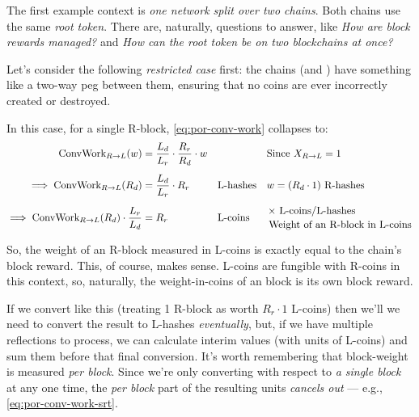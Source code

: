 The first example context is \emph{one network split over two chains}.
Both chains use the same \emph{root token}.
There are, naturally, questions to answer,
    like \emph{How are block rewards managed?}
    and \emph{How can the root token be on two blockchains at once?}

Let's consider the following \emph{restricted case} first: the chains (\cL and \cR) have something like a two-way peg between them, ensuring that no coins are ever incorrectly created or destroyed.

In this case, for a single R-block, \autoref{eq:por-conv-work} collapses to:
\begin{align}
    \text{ConvWork}_{R\rightarrow L}(w) = \; & \frac{L_d}{L_r} \cdot \frac{R_r}{R_d} \cdot w %
        & & %
        & & \text{Since }X_{R\rightarrow L}=1
        \nonumber
        \\[0.5em]
    \implies \text{ConvWork}_{R\rightarrow L}(R_d) = \; & \frac{L_d}{L_r} \cdot R_r
        & & \text{L-hashes}
        & & w = (R_d \cdot 1) \text{ R-hashes}
        \label{eq:por-conv-work-srt}
        \\[0.5em]
    \implies \text{ConvWork}_{R\rightarrow L}(R_d) \cdot \frac{L_r}{L_d} = \; & R_r
        & & \text{L-coins}
        & & \genfrac{}{}{0pt}{}{\times \text{ L-coins/L-hashes}\qquad\qquad\quad\;\;}{\text{Weight of an R-block in L-coins}}
        \nonumber
\end{align}

So, the weight of an R-block measured in L-coins is exactly equal to the \cR chain's block reward.
This, of course, makes sense.
L-coins are fungible with R-coins in this context, so, naturally, the weight-in-coins of an \cR block is its own block reward.

If we convert like this (treating 1 R-block as worth $R_r \cdot 1$ L-coins) then we'll we need to convert the result to L-hashes \emph{eventually}, but, if we have multiple reflections to process, we can calculate interim values (with units of L-coins) and sum them before that final conversion.
It's worth remembering that block-weight is measured \emph{per block}.
Since we're only converting with respect to \emph{a single block} at any one time, the \emph{per block} part of the resulting units \emph{cancels out} --- e.g., \autoref{eq:por-conv-work-srt}.


